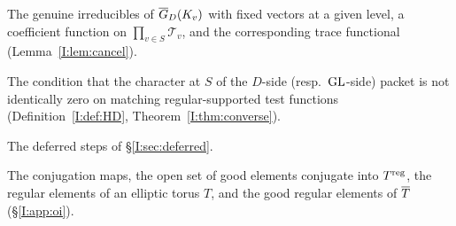 \begin{description}[style=nextline,leftmargin=1.5em]
\item[$\mathcal T_v$, $a$, $\Lambda_a$] The genuine irreducibles of $\GDb(K_v)$ with fixed vectors at a given level, a coefficient function on $\prod_{v\in S}\mathcal T_v$, and the corresponding trace functional (Lemma~\ref{I:lem:cancel}).
\item[$(\mathrm{Hyp}_D)$, (Hyp); elliptic detectability] The condition that the character at $S$ of the $D$-side (resp.\ $\GL$-side) packet is not identically zero on matching regular-supported test functions (Definition~\ref{I:def:HD}, Theorem~\ref{I:thm:converse}).
\item[(D1)--(D4)] The deferred steps of \S\ref{I:sec:deferred}.
\item[$\Psi$, $\tilde\Psi$, $\Gb_T$, $T^{\reg}$, $\Tb^{g,\reg}$] The conjugation maps, the open set of good elements conjugate into $T^{\reg}$, the regular elements of an elliptic torus $T$, and the good regular elements of $\Tb$ (\S\ref{I:app:oi}).
\end{description}
\endgroup
\begingroup
\providecommand{\ov}{}\renewcommand{\ov}[1]{\overline{#1}}
\providecommand{\A}{}\renewcommand{\A}{\mathbb{A}}
\providecommand{\C}{}\renewcommand{\C}{\mathbb{C}}
\providecommand{\Z}{}\renewcommand{\Z}{\mathbb{Z}}
\providecommand{\cO}{}\renewcommand{\cO}{\mathcal{O}}
\providecommand{\fp}{}\renewcommand{\fp}{\mathfrak{p}}
\providecommand{\gen}{}\renewcommand{\gen}{\mathrm{gen}}
\providecommand{\reg}{}\renewcommand{\reg}{\mathrm{reg}}
\providecommand{\tr}{}\renewcommand{\tr}{\operatorname{tr}}
\providecommand{\Nrd}{}\renewcommand{\Nrd}{\operatorname{Nrd}}
\providecommand{\Ad}{}\renewcommand{\Ad}{\operatorname{Ad}}
\providecommand{\Iso}{}\renewcommand{\Iso}{\operatorname{Iso}}
\providecommand{\vol}{}\renewcommand{\vol}{\operatorname{vol}}
\providecommand{\supp}{}\renewcommand{\supp}{\operatorname{supp}}
\providecommand{\Cent}{}\renewcommand{\Cent}{\operatorname{Cent}}
\providecommand{\GL}{}\renewcommand{\GL}{\mathrm{GL}}
\providecommand{\St}{}\renewcommand{\St}{\mathrm{St}}
\providecommand{\Gb}{}\renewcommand{\Gb}{\ov{G}}
\providecommand{\Zb}{}\renewcommand{\Zb}{\ov{Z}}
\providecommand{\GDb}{}\renewcommand{\GDb}{\ov{G}_D}
\providecommand{\pib}{}\renewcommand{\pib}{\ov{\pi}}
\providecommand{\Eb}{}\renewcommand{\Eb}{\ov{E}}
\providecommand{\Tb}{}\renewcommand{\Tb}{\ov{T}}
\providecommand{\cG}{}\renewcommand{\cG}{\mathcal{G}}
\providecommand{\cGb}{}\renewcommand{\cGb}{\ov{\mathcal{G}}}
\providecommand{\iD}{}\renewcommand{\iD}{\iota_D}
\providecommand{\iG}{}\renewcommand{\iG}{\iota_{\GL}}
\providecommand{\jj}{}\renewcommand{\jj}{\jmath}
\providecommand{\sg}{}\renewcommand{\sg}{\sigma}
\providecommand{\Pv}{}\renewcommand{\Pv}{\textbf{(P)}}
\providecommand{\Ev}{}\renewcommand{\Ev}{\textbf{(E)}}
\providecommand{\Ov}{}\renewcommand{\Ov}{\textbf{(O)}}
\providecommand{\Cv}{}\renewcommand{\Cv}{\textbf{(C)}}
